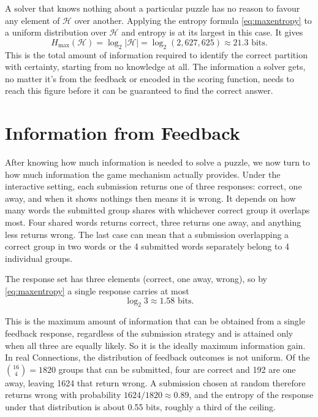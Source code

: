 A solver that knows nothing about a particular puzzle has no reason to favour any element of $\mathcal{H}$ over another. Applying the entropy formula \autoref{eq:maxentropy} to a uniform distribution over $\mathcal{H}$ and entropy is at its largest in this case. It gives
\begin{equation}
H_{\text{max}}(\mathcal{H}) = \log_2 |\mathcal{H}| = \log_2 (2{,}627{,}625) \approx 21.3 \text{ bits}.
\label{eq:prior-entropy}
\end{equation}
This is the total amount of information required to identify the correct partition with certainty, starting from no knowledge at all. The information a solver gets, no matter it's from the feedback or encoded in the scoring function, needs to reach this figure before it can be guaranteed to find the correct answer.

\section{Information from Feedback}
\label{sec:feedback-information}
After knowing how much information is needed to solve a puzzle, we now turn to how much information the game mechanism actually provides. Under the interactive setting, each submission returns one of three responses: correct, one away, and when it shows nothings then means it is wrong. It depends on how many words the submitted group shares with whichever correct group it overlaps most. Four shared words returns correct, three returns one away, and anything less returns wrong. The last case can mean that a submission overlapping a correct group in two words or the 4 submitted words separately belong to 4 individual groups.

The response set has three elements (correct, one away, wrong), so by \autoref{eq:maxentropy} a single response carries at most
\begin{equation}
\log_2 3 \approx 1.58 \text{ bits}.
\label{eq:single-feedback}
\end{equation}

This is the maximum amount of information that can be obtained from a single feedback response, regardless of the submission strategy and is attained only when all three are equally likely. So it is the ideally maximum information gain. In real Connections, the distribution of feedback outcomes is not uniform. Of the $\binom{16}{4} = 1820$ groups that can be submitted, four are correct and 192 are one away, leaving 1624 that return wrong. A submission chosen at random therefore returns wrong with probability $1624/1820 \approx 0.89$, and the entropy of the response under that distribution is about 0.55 bits, roughly a third of the ceiling.

